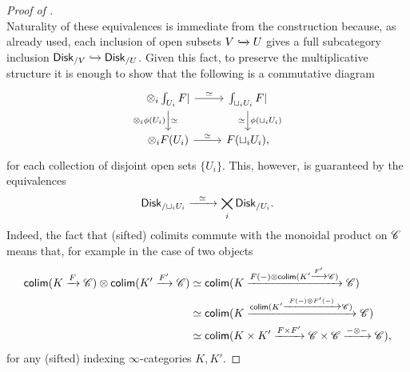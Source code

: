 \documentclass[../text]{subfiles}
\begin{document}
\begin{proof}[Proof of {}]
\begin{equation}
    \end{equation}
    Naturality of these equivalences is immediate from the construction because, as already used, each inclusion of open subsets $V \xhookrightarrow{} U$ gives a full subcategory inclusion $\disk[r]_{/V} \xhookrightarrow{} \disk[r]_{/U}$. Given this fact, to preserve the multiplicative structure it is enough to show that the following is a commutative diagram
    \begin{equation}\label{eq:mult_strut_comm_square}
        \begin{tikzcd}
            \otimes_i \int_{U_i} F| \arrow[r, "\simeq"] \arrow[d, "\otimes_i \phi (U_i)"', "\simeq"] & \int_{\sqcup_i U_i} F| \arrow[d, "\phi (\sqcup_i U_i)", "\simeq"']\\
            \otimes_i F (U_i) \arrow[r, "\simeq"] & F (\sqcup_i U_i),
        \end{tikzcd}
    \end{equation}
    for each collection of disjoint open sets $\{U_i\}$. This, however, is guaranteed by the equivalences
    \begin{equation}
        \disk[r]_{/\sqcup_i U_i} \xrightarrow{\ \ \simeq \ \ } \bigtimes_i \disk[r]_{/U_i}.
    \end{equation}
    Indeed, the fact that (sifted) colimits commute with the monoidal product on $\mathscr{C}$ means that, for example in the case of two objects
    \begin{align}
        \mathsf{colim}(K \xrightarrow{F} \mathscr{C}) \otimes \mathsf{colim}(K' \xrightarrow{F'} \mathscr{C}) &\simeq \mathsf{colim}(K \xrightarrow{F(-) \otimes \mathsf{colim}(K' \xrightarrow{F'} \mathscr{C})} \mathscr{C})\notag\\
        &\simeq \mathsf{colim}(K \xrightarrow{\mathsf{colim}(K' \xrightarrow{F(-) \otimes F'(-)} \mathscr{C})} \mathscr{C})\notag\\
        &\simeq \mathsf{colim}(K \times K' \xrightarrow{F \times F'} \mathscr{C} \times \mathscr{C} \xrightarrow{- \otimes -} \mathscr{C}),
    \end{align}
    for any (sifted) indexing $\infty$-categories $K, K'$.


\end{proof}
\end{document}
